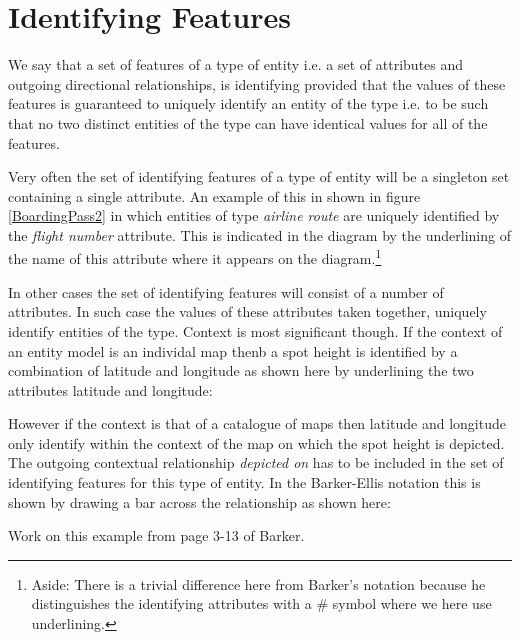\section{Identifying Features}
\label{IdentifyingFeatures}

\mynote We say that a set of features of a type of entity i.e. a set of attributes and outgoing directional relationships, is identifying provided that the values of these features is guaranteed to uniquely identify an entity of the type i.e. to be such that no two distinct entities of the type can have identical values for all of the features.

\mynote Very often the set of identifying features of a type of entity will be a singleton set containing a single attribute. An example of this 
in  shown in figure \ref{BoardingPass2} in which entities of type \textit{airline route} are uniquely identified by the \textit{flight number} attribute. This is
indicated in the diagram  by the underlining of the name of this attribute where it appears on the diagram.\footnote{Aside: There is a trivial difference here from Barker's notation because he distinguishes the identifying attributes with a \# symbol where we here use  underlining.} 

\mynote In other cases the set of identifying features will consist of a number of attributes. In such case  the values of these attributes taken together, uniquely identify entities of the type. Context is most significant though.
If the context of an entity model is an individal map thenb a spot height is identified by a combination of latitude and longitude as shown here by underlining the two attributes latitude and longitude: 

\begin{center}

\end{center}

However if the context is that of a catalogue of maps then latitude and longitude only identify within the context of the map on which the spot height is depicted. The outgoing contextual relationship \textit{depicted on}
has to be included in the set of identifying features for this type of entity. In the Barker-Ellis notation this is shown by drawing a bar across the relationship as shown here:  

\begin{center}

\end{center}

\mynote Work on this example from page 3-13 of Barker.

